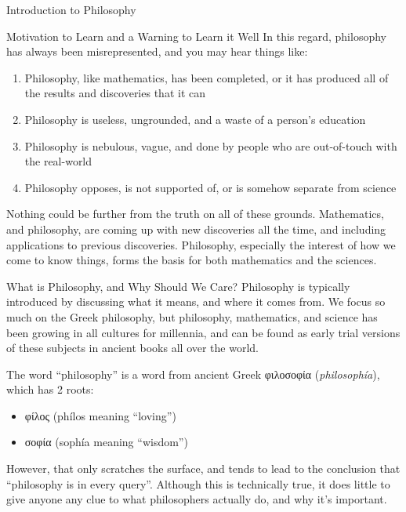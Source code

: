 \begin{chapter}{Introduction to Philosophy}
\begin{section}{Motivation to Learn and a Warning to Learn it Well}
        In this regard, philosophy has always been misrepresented, and you may hear things like:
        \begin{enumerate}
            \item Philosophy, like mathematics, has been completed, or it has produced all of the results and discoveries that it can
                
            \item Philosophy is useless, ungrounded, and a waste of a person's education
                
            \item Philosophy is nebulous, vague, and done by people who are out-of-touch with the real-world
                
            \item Philosophy opposes, is not supported of, or is somehow separate from science
        \end{enumerate}
            
        Nothing could be further from the truth on all of these grounds. Mathematics, and philosophy, are coming up with new discoveries all the time, and including applications to previous discoveries. Philosophy, especially the interest of how we come to know things, forms the basis for both mathematics and the sciences.
    \end{section}
    
    \begin{section}{What is Philosophy, and Why Should We Care?}
        Philosophy is typically introduced by discussing what it means, and where it comes from. We focus so much on the Greek philosophy, but philosophy, mathematics, and science has been growing in all cultures for millennia, and can be found as early trial versions of these subjects in ancient books all over the world.
            
        The word ``philosophy'' is a word from ancient Greek φιλοσοφία (\emph{philosophía}), which has 2 roots:
        \begin{itemize}
            \item φίλος (phílos meaning “loving”)
            \item σοφία (sophía meaning “wisdom”)
        \end{itemize}
            
        However, that only scratches the surface, and tends to lead to the conclusion that “philosophy is in every query”. Although this is technically true, it does little to give anyone any clue to what philosophers actually do, and why it’s important.
            

\end{section}
\end{chapter}
